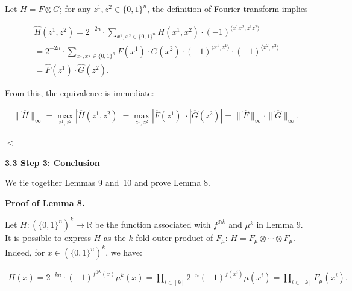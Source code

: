 Let $H=F\otimes G$; for any $z^{1},z^{2}\in\{0,1\}^{n}$, the definition of Fourier transform implies\par


\[\begin{gathered}
\displaystyle\widehat{H}(z^{1},z^{2}) \displaystyle=2^{-2n}\cdot\sum\nolimits_{x^{1},x^{2}\in\{0,1\}^{n}}H(x^{1},x^{2})\cdot(-1)^{\langle x^{1}x^{2},z^{1}z^{2}\rangle} \\
\displaystyle=2^{-2n}\cdot\sum\nolimits_{x^{1},x^{2}\in\{0,1\}^{n}}F(x^{1})\cdot G(x^{2})\cdot(-1)^{\langle x^{1},z^{1}\rangle}\cdot(-1)^{\langle x^{2},z^{2}\rangle} \\
\displaystyle=\widehat{F}(z^{1})\cdot\widehat{G}(z^{2}).
\end{gathered}\]


From this, the equivalence is immediate:\par


\[\begin{gathered}
\|\widehat{H}\|_{\infty}=\max_{z^{1},z^{2}}|\widehat{H}(z^{1},z^{2})|=\max_{z^{1},z^{2}}|\widehat{F}(z^{1})|\cdot|\widehat{G}(z^{2})|=\|\widehat{F}\|_{\infty}\cdot\|\widehat{G}\|_{\infty}.\
\end{gathered}\]


$\vartriangleleft$\par






\par\medskip\noindent\textbf{
3.3 Step 3: Conclusion}\par




We tie together Lemmas 9 and 10 and prove Lemma 8.\par




\par\medskip\noindent\textbf{Proof of Lemma 8.}\par




Let $H\colon(\{0,1\}^{n})^{k}\to\mathbb{R}$ be the function associated with $f^{\oplus k}$ and $\mu^{k}$ in Lemma 9. It is possible to express $H$ as the $k$-fold outer-product of $F_{\mu}$: $H=F_{\mu}\otimes\cdots\otimes F_{\mu}$. Indeed, for $x\in(\{0,1\}^{n})^{k}$, we have:\par


\[\begin{gathered}
H(x)=2^{-kn}\cdot(-1)^{f^{\oplus k}(x)}\mu^{k}(x)=\prod\nolimits_{i\in[k]}2^{-n}(-1)^{f(x^{i})}\mu(x^{i})=\prod\nolimits_{i\in[k]}F_{\mu}(x^{i}).
\end{gathered}\]


